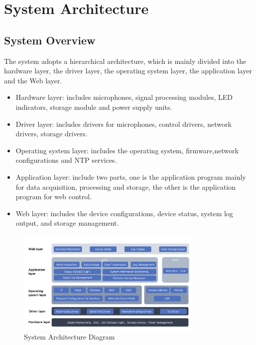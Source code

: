 \documentclass{article}
\begin{document}
\section{System Architecture}
\subsection{System Overview}
The system adopts a hierarchical architecture, which is mainly divided into the hardware layer, the driver layer, the operating system layer, the application layer and the Web layer. 
\begin{itemize}
    \item Hardware layer: includes microphones, signal processing modules, LED indicators, storage module and power supply units.
    \item Driver layer: includes drivers for microphones, control drivers, network drivers, storage drivers.
    \item Operating system layer: includes the operating system, firmware,network configurations and NTP services.
    \item Application layer: include two parts, one is the application program mainly for data acquisition, processing and storage, the other is the application program for web control.
    \item Web layer: includes the device configurations, device status, system log output, and storage management.
\end{itemize}
\begin{figure}[htbp]
    \centering
    \includegraphics[width=0.8\textwidth]{./系统框架图.png}
    \caption{System Architecture Diagram}
    \label{fig:system-architecture}
\end{figure}
\end{document}
